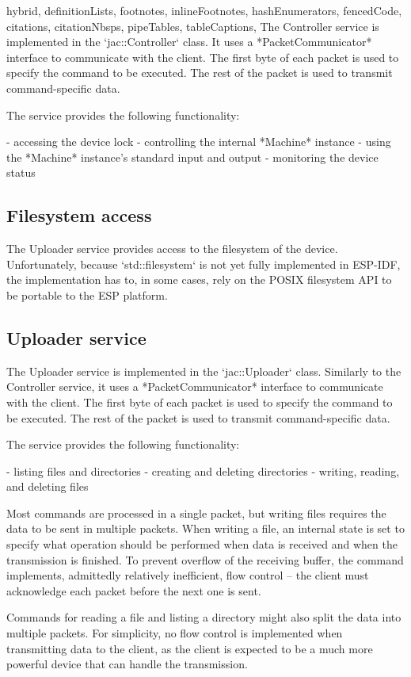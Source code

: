 \documentclass[
  digital,
  oneside,
  nosansbold,
  nocolorbold,
  lof,
  lot
]{fithesis4}
\begin{document}
\begin{markdown*}{%
  hybrid,
  definitionLists,
  footnotes,
  inlineFootnotes,
  hashEnumerators,
  fencedCode,
  citations,
  citationNbsps,
  pipeTables,
  tableCaptions,
}
The Controller service is implemented in the `jac::Controller` class. It uses a *PacketCommunicator* interface to communicate with the client. The first byte of each packet is used to specify the command to be executed. The rest of the packet is used to transmit command-specific data.

The service provides the following functionality:

  - accessing the device lock
  - controlling the internal *Machine* instance
  - using the *Machine* instance's standard input and output
  - monitoring the device status

\subsection{Filesystem access}

The Uploader service provides access to the filesystem of the device. Unfortunately, because `std::filesystem` is not yet fully implemented in ESP-IDF, the implementation has to, in some cases, rely on the POSIX filesystem API to be portable to the ESP platform.

\subsection{Uploader service}

The Uploader service is implemented in the `jac::Uploader` class. Similarly to the Controller service, it uses a *PacketCommunicator* interface to communicate with the client. The first byte of each packet is used to specify the command to be executed. The rest of the packet is used to transmit command-specific data.

The service provides the following functionality:

  - listing files and directories
  - creating and deleting directories
  - writing, reading, and deleting files

Most commands are processed in a single packet, but writing files requires the data to be sent in multiple packets. When writing a file, an internal state is set to specify what operation should be performed when data is received and when the transmission is finished. To prevent overflow of the receiving buffer, the command implements, admittedly relatively inefficient, flow control -- the client must acknowledge each packet before the next one is sent.

Commands for reading a file and listing a directory might also split the data into multiple packets. For simplicity, no flow control is implemented when transmitting data to the client, as the client is expected to be a much more powerful device that can handle the transmission.



\end{markdown*}
\end{document}
